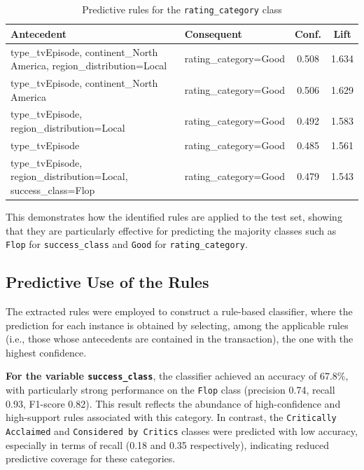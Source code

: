 \documentclass{article}
\begin{document}
\begin{table}[htbp]
\centering
\caption{Predictive rules for the \texttt{rating\_category} class}
\label{tab:rating_good_rules}
\begin{tabular}{|p{6.5cm}|p{3.5cm}|c|c|}
\hline
\textbf{Antecedent} & \textbf{Consequent} & \textbf{Conf.} & \textbf{Lift} \\
\hline
type\_tvEpisode, continent\_North America, region\_distribution=Local & rating\_category=Good & 0.508 & 1.634 \\
\hline
type\_tvEpisode, continent\_North America & rating\_category=Good & 0.506 & 1.629 \\
\hline
type\_tvEpisode, region\_distribution=Local & rating\_category=Good & 0.492 & 1.583 \\
\hline
type\_tvEpisode & rating\_category=Good & 0.485 & 1.561 \\
\hline
type\_tvEpisode, \newline region\_distribution=Local, \newline success\_class=Flop & rating\_category=Good & 0.479 & 1.543 \\
\hline
\end{tabular}
\end{table}

This demonstrates how the identified rules are applied to the test set, showing that they are particularly effective for predicting the majority classes such as \texttt{Flop} for \texttt{success\_class} and \texttt{Good} for \texttt{rating\_category}.


\subsection{Predictive Use of the Rules}
The extracted rules were employed to construct a rule-based classifier, where the prediction for each instance is obtained by selecting, among the applicable rules (i.e., those whose antecedents are contained in the transaction), the one with the highest confidence.

\textbf{For the variable \texttt{success\_class}}, the classifier achieved an accuracy of 67.8\%, with particularly strong performance on the \texttt{Flop} class (precision 0.74, recall 0.93, F1-score 0.82). This result reflects the abundance of high-confidence and high-support rules associated with this category. In contrast, the \texttt{Critically Acclaimed} and \texttt{Considered by Critics} classes were predicted with low accuracy, especially in terms of recall (0.18 and 0.35 respectively), indicating reduced predictive coverage for these categories.
\end{document}
